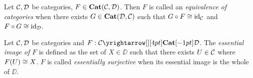 \begin{dfn}
  
  Let $\mathcal{C}, \mathcal{D}$ be categories, $F \in \mathbf{Cat}(\mathcal{C},\mathcal{D})$.
  Then $F$ is called an \emph{equivalence of categories} when 
  there exists $G \in \mathbf{Cat}(\mathcal{D},\mathcal{C})$ such that  
  $G \circ F \cong \mathrm{id}_{\mathcal{C}}$ and $F\circ G \cong \mathrm{id}_{\mathcal{D}}$. 
\end{dfn}

\begin{dfn}
  
  Let $\mathcal{C},\mathcal{D}$ be categories and $F : \map{\CC}{\DD}{\CAT}{}$. 
  The \emph{essential image of $F$} is defined as
  the set of $X \in \DD$ such that 
  there exists $U \in \mathcal{C}$ where $F(U) \cong X$.
  $F$ is called \emph{essentially surjective} when
  its essential image is the whole of $\DD$.
\end{dfn}

